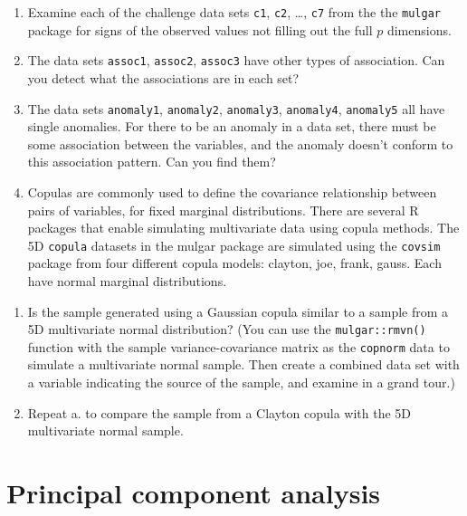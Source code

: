 \documentclass[
  letterpaper,
]{krantz}
\begin{document}
\begin{enumerate}
\def\labelenumi{\arabic{enumi}.}
\setcounter{enumi}{3}
\item
  Examine each of the challenge data sets \texttt{c1}, \texttt{c2},
  \ldots, \texttt{c7} from the the \texttt{mulgar} package for signs of
  the observed values not filling out the full \(p\) dimensions.
\item
  The data sets \texttt{assoc1}, \texttt{assoc2}, \texttt{assoc3} have
  other types of association. Can you detect what the associations are
  in each set?
\item
  The data sets \texttt{anomaly1}, \texttt{anomaly2}, \texttt{anomaly3},
  \texttt{anomaly4}, \texttt{anomaly5} all have single anomalies. For
  there to be an anomaly in a data set, there must be some association
  between the variables, and the anomaly doesn't conform to this
  association pattern. Can you find them?
\item
  Copulas are commonly used to define the covariance relationship
  between pairs of variables, for fixed marginal distributions. There
  are several R packages that enable simulating multivariate data using
  copula methods. The 5D \texttt{copula} datasets in the mulgar package
  are simulated using the \texttt{covsim} package from four different
  copula models: clayton, joe, frank, gauss. Each have normal marginal
  distributions.
\end{enumerate}

\begin{enumerate}
\def\labelenumi{\alph{enumi}.}
\item
  Is the sample generated using a Gaussian copula similar to a sample
  from a 5D multivariate normal distribution? (You can use the
  \texttt{mulgar::rmvn()} function with the sample variance-covariance
  matrix as the \texttt{copnorm} data to simulate a multivariate normal
  sample. Then create a combined data set with a variable indicating the
  source of the sample, and examine in a grand tour.)
\item
  Repeat a. to compare the sample from a Clayton copula with the 5D
  multivariate normal sample.
\end{enumerate}

\chapter{Principal component
analysis}\label{principal-component-analysis}

\end{document}
